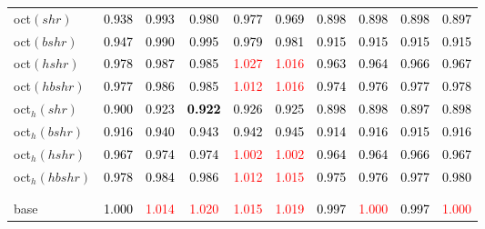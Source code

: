 \begin{tabular}[t]{l|ccccccccc}
oct$(shr)$ & \textcolor{black}{0.938} & \textcolor{black}{0.993} & \textcolor{black}{0.980} & \textcolor{black}{0.977} & \textcolor{black}{0.969} & \textcolor{black}{0.898} & \textcolor{black}{0.898} & \textcolor{black}{0.898} & \textcolor{black}{0.897}\\
oct$(bshr)$ & \textcolor{black}{0.947} & \textcolor{black}{0.990} & \textcolor{black}{0.995} & \textcolor{black}{0.979} & \textcolor{black}{0.981} & \textcolor{black}{0.915} & \textcolor{black}{0.915} & \textcolor{black}{0.915} & \textcolor{black}{0.915}\\
oct$(hshr)$ & \textcolor{black}{0.978} & \textcolor{black}{0.987} & \textcolor{black}{0.985} & \textcolor{red}{1.027} & \textcolor{red}{1.016} & \textcolor{black}{0.963} & \textcolor{black}{0.964} & \textcolor{black}{0.966} & \textcolor{black}{0.967}\\
oct$(hbshr)$ & \textcolor{black}{0.977} & \textcolor{black}{0.986} & \textcolor{black}{0.985} & \textcolor{red}{1.012} & \textcolor{red}{1.016} & \textcolor{black}{0.974} & \textcolor{black}{0.976} & \textcolor{black}{0.977} & \textcolor{black}{0.978}\\
oct$_h(shr)$ & \textcolor{black}{0.900} & \textcolor{black}{0.923} & \textcolor{black}{\textbf{0.922}} & \textcolor{black}{0.926} & \textcolor{black}{0.925} & \textcolor{black}{0.898} & \textcolor{black}{0.898} & \textcolor{black}{0.897} & \textcolor{black}{0.898}\\
oct$_h(bshr)$ & \textcolor{black}{0.916} & \textcolor{black}{0.940} & \textcolor{black}{0.943} & \textcolor{black}{0.942} & \textcolor{black}{0.945} & \textcolor{black}{0.914} & \textcolor{black}{0.916} & \textcolor{black}{0.915} & \textcolor{black}{0.916}\\
oct$_h(hshr)$ & \textcolor{black}{0.967} & \textcolor{black}{0.974} & \textcolor{black}{0.974} & \textcolor{red}{1.002} & \textcolor{red}{1.002} & \textcolor{black}{0.964} & \textcolor{black}{0.964} & \textcolor{black}{0.966} & \textcolor{black}{0.967}\\
oct$_h(hbshr)$ & \textcolor{black}{0.978} & \textcolor{black}{0.984} & \textcolor{black}{0.986} & \textcolor{red}{1.012} & \textcolor{red}{1.015} & \textcolor{black}{0.975} & \textcolor{black}{0.976} & \textcolor{black}{0.977} & \textcolor{black}{0.980}\\[-1.5ex]
\hline\\[-1.5ex]
\addlinespace[0.3em]
\multicolumn{10}{c}{\textbf{$k = 1$}}\\
base & \textcolor{black}{1.000} & \textcolor{red}{1.014} & \textcolor{red}{1.020} & \textcolor{red}{1.015} & \textcolor{red}{1.019} & \textcolor{black}{0.997} & \textcolor{red}{1.000} & \textcolor{black}{0.997} & \textcolor{red}{1.000}\\

\end{tabular}
